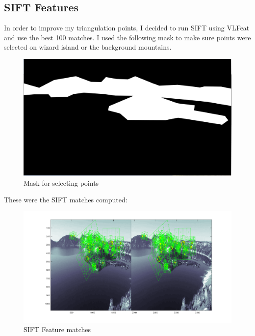 \documentclass[11pt,psfig]{article}
\begin{document}
\newpage

\subsection{SIFT Features}

In order to improve my triangulation points, I decided to run SIFT using VLFeat and use the best 100 matches. I used the following mask to make sure points were selected on wizard island or the background mountains. 
\begin{figure}[H]
\centering
\includegraphics[width=\columnwidth]{sfmResults1/Shot4Mask.png}
\caption{Mask for selecting points}
\end{figure}
These were the SIFT matches computed:
\begin{figure}[H]
\centering
\includegraphics[width=\columnwidth]{sfmResults1/siftMatchesVLFeat1.png}
\caption{SIFT Feature matches}
\end{figure}
\end{document}

